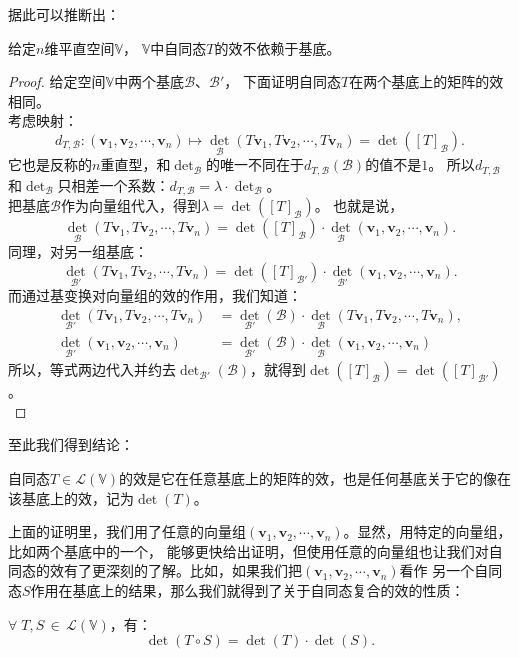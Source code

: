 \documentclass[12pt,UTF8,fontset=none]{ctexbook}
\begin{document}
据此可以推断出：
\begin{pp}\label{pp:10_10}
    给定$n$维平直空间$\mathbb{V}$，
    $\mathbb{V}$中自同态$T$的效不依赖于基底。
\end{pp}
\begin{proof} %
    给定空间$\mathbb{V}$中两个基底$\mathcal{B}$、$\mathcal{B}'$，
    下面证明自同态$T$在两个基底上的矩阵的效相同。\\
    考虑映射：
    $$ d_{T, \mathcal{B}} : (\mathbf{v}_1, \mathbf{v}_2, \cdots , \mathbf{v}_n) \mapsto \det_\mathcal{B} (T\mathbf{v}_1, T\mathbf{v}_2, \cdots , T\mathbf{v}_n) = \det([T]_\mathcal{B}).$$
    它也是反称的$n$重直型，和$\det_\mathcal{B}$的唯一不同在于$d_{T, \mathcal{B}}(\mathcal{B})$的值不是$1$。
    所以$d_{T, \mathcal{B}}$和$\det_{\mathcal{B}}$只相差一个系数：$d_{T, \mathcal{B}} = \lambda \cdot \det_{\mathcal{B}}$。\\
    把基底$\mathcal{B}$作为向量组代入，得到$\lambda = \det([T]_\mathcal{B})$。
    也就是说，
    $$ \det_\mathcal{B} (T\mathbf{v}_1, T\mathbf{v}_2, \cdots , T\mathbf{v}_n) = \det([T]_\mathcal{B}) \cdot \det_\mathcal{B} (\mathbf{v}_1, \mathbf{v}_2, \cdots , \mathbf{v}_n). $$
    同理，对另一组基底：
    $$ \det_{\mathcal{B}'} (T\mathbf{v}_1, T\mathbf{v}_2, \cdots , T\mathbf{v}_n) = \det([T]_{\mathcal{B}'}) \cdot \det_{\mathcal{B}'} (\mathbf{v}_1, \mathbf{v}_2, \cdots , \mathbf{v}_n). $$
    而通过基变换对向量组的效的作用，我们知道：
    \begin{align*}
        \det_{\mathcal{B}'} (T\mathbf{v}_1, T\mathbf{v}_2, \cdots , T\mathbf{v}_n) &= \det_{\mathcal{B}'}(\mathcal{B}) \cdot \det_\mathcal{B} (T\mathbf{v}_1, T\mathbf{v}_2, \cdots , T\mathbf{v}_n),  \\
        \det_{\mathcal{B}'} (\mathbf{v}_1, \mathbf{v}_2, \cdots , \mathbf{v}_n) &= \det_{\mathcal{B}'}(\mathcal{B}) \cdot \det_\mathcal{B} (\mathbf{v}_1, \mathbf{v}_2, \cdots , \mathbf{v}_n) 
    \end{align*}
    所以，等式两边代入并约去$\det_{\mathcal{B}'}(\mathcal{B})$，就得到$\det([T]_\mathcal{B}) = \det([T]_{\mathcal{B}'})$。\\
\end{proof}
至此我们得到结论：
\begin{df}
    自同态$T\in\mathcal{L}(\mathbb{V})$的效是它在任意基底上的矩阵的效，也是任何基底关于它的像在该基底上的效，记为$\det(T)$。
\end{df}

上面的证明里，我们用了任意的向量组$(\mathbf{v}_1, \mathbf{v}_2, \cdots , \mathbf{v}_n)$。显然，用特定的向量组，比如两个基底中的一个，
能够更快给出证明，但使用任意的向量组也让我们对自同态的效有了更深刻的了解。比如，如果我们把$(\mathbf{v}_1, \mathbf{v}_2, \cdots , \mathbf{v}_n)$看作
另一个自同态$S$作用在基底上的结果，那么我们就得到了关于自同态复合的效的性质：
\begin{pp}
    $\forall \;T,S\,\in\,\mathcal{L}(\mathbb{V})$，有：
    $$ \det (T\circ S) = \det(T) \cdot \det(S). $$
\end{pp}
\end{document}
